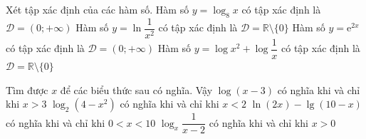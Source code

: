 \begin{ex}%
 Xét tập xác định của các hàm  số.
  \choiceTF
  {\True Hàm số $y  = \log_8 x$ có tập xác định là $\mathscr{D} = (0;+\infty)$}
  {\True Hàm số $y = \ln \dfrac{1}{x^2}$ có  tập xác định là $\mathscr{D} = \mathbb{R}\setminus \{0\}$}
  {Hàm số $y=\mathrm{e}^{2x}$  có tập xác định là $\mathscr{D} = (0;+\infty)$}
  {Hàm số $y = \log x^2 +  \log\dfrac{1}{x}$ có tập xác định là $\mathscr{D} = \mathbb{R}\setminus \{0\}$}
\end{ex}

\begin{ex}%
 Tìm được $x$ để các biểu thức sau có nghĩa.  Vậy
  \choiceTF
  {\True $\log (x-3)$ có nghĩa khi và chỉ khi  $x > 3$}
   {$\log_2 \left(4-x^2 \right)$ có nghĩa khi và chỉ khi $x < 2$}
  {\True $\ln (2x)-\lg (10-x)$ có nghĩa khi  và chỉ khi $0< x < 10$}
  {$\log_x \dfrac{1}{x-2}$ có nghĩa khi và chỉ  khi $x > 0$}
\end{ex}


